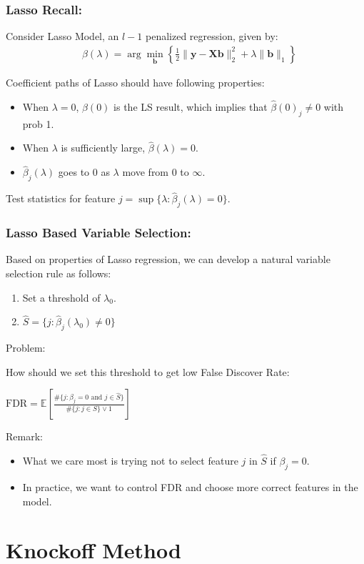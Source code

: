 \documentclass{beamer}
\begin{document}
\begin{frame}
\frametitle{Lasso Recall:}
Consider Lasso Model, an $l-1$ penalized regression, given by:
\begin{align*}
& \hat{\beta}(\lambda) = \arg\min_{\textbf{b}} \left\{\frac{1}{2}\|\bm{y}- \bm{X}\bm{b}\|_2^2 + \lambda\|\bm{b}\|_1 \right\}
\end{align*}

Coefficient paths of Lasso should have following properties:
\begin{itemize}
\item When $\lambda = 0$, $\hat{\beta}(0)$ is the LS result, which implies that $\hat{\beta}(0)_j\neq 0$ with prob 1.
\item When $\lambda$ is sufficiently large, $\hat{\beta}(\lambda) = 0$.
\item $\hat{\beta}_j(\lambda)$ goes to 0 as $\lambda$ move from $0$ to $\infty$. 
\end{itemize}

Test statistics for feature $j = \sup\{\lambda: \hat{\beta}_j(\lambda) =0 \}$.
\end{frame}

\begin{frame}
\frametitle{Lasso Based Variable Selection:}
Based on properties of Lasso regression, we can develop a natural variable selection rule as follows:
\begin{enumerate}
\item Set a threshold of $\lambda_0$.
\item $\hat S = \{j: \hat{\beta}_j(\lambda_0)\neq 0 \}$
\end{enumerate}

Problem: 

How should we set this threshold to get low False Discover Rate:

$\text{FDR} = \mathbb{E}\left[\frac{\#\{j:\beta_j =0 \text{ and }j\in \hat{S} \} }{\#\{j:j\in S\}\vee 1 } \right]$

Remark:
\begin{itemize}
\item What we care most is trying not to select feature $j$ in $\hat S$ if $\beta_j = 0$.
\item In practice, we want to control FDR and choose more correct features in the model.
\end{itemize}
\end{frame}

\section{Knockoff Method }
\end{document}
